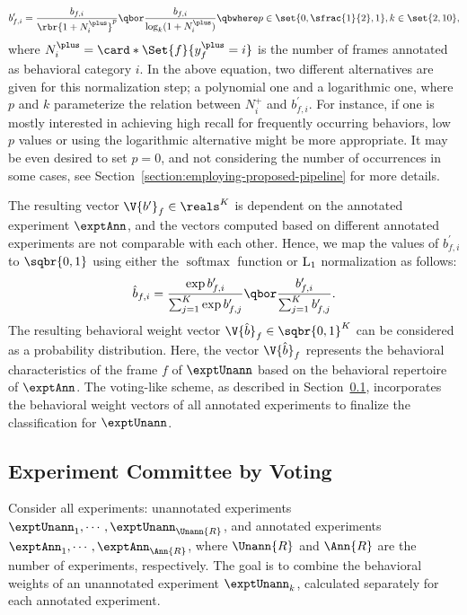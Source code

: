 \begin{equation}\label{equation:behavioral-weight-occurence-normalization}
	b^\prime_{f,i} = \frac{b_{f,i}}{\rbr{1 + N^{\plus}_i}^p} \qbor \frac{b_{f,i}}{\log_k(1 + N^{\plus}_i)} \qbwhere p \in \set{0, \sfrac{1}{2}, 1}, k \in \set{2, 10},
\end{equation}
where $N^{\plus}_i = \card*{\Set{f}{y^{\plus}_f=i}}$ is the number of frames annotated as behavioral category $i$.
In the above equation, two different alternatives are given for this normalization step; a polynomial one and a logarithmic one, where $p$ and $k$ parameterize the relation between $N^{\plus}_i$ and $b^\prime_{f,i}$.
For instance, if one is mostly interested in achieving high recall for frequently occurring behaviors, low $p$ values or using the logarithmic alternative might be more appropriate.
It may be even desired to set $p=0$, and not considering the number of occurrences in some cases, see Section~\ref{section:employing-proposed-pipeline} for more details.

The resulting vector $\V{b^{\prime}}_f \in \reals^K$ is dependent on the annotated experiment $\exptAnn$, and the vectors computed based on different annotated experiments are not comparable with each other.
Hence, we map the values of $b^\prime_{f,i}$ to $\sqbr{0,1}$ using either the $\operatorname {softmax}$ function or $\textnormal{L}_1$ normalization as follows:
\begin{equation}\label{equation:behavioral-weight-activation}
	\hat{b}_{f,i} = \frac{\exp{b^\prime_{f,i}}}{\sum_{j=1}^{K} \exp{b^\prime_{f,j}}} \qbor \frac{b^\prime_{f,i}}{\sum_{j=1}^{K} b^\prime_{f,j}}.
\end{equation}
The resulting behavioral weight vector $\V{\hat{b}}_f \in \sqbr{0,1}^K$ can be considered as a probability distribution.
Here, the vector $\V{\hat{b}}_f$ represents the behavioral characteristics of the frame $f$ of $\exptUnann$ based on the behavioral repertoire of $\exptAnn$.
The voting-like scheme, as described in Section~\ref{section:committee-by-voting}, incorporates the behavioral weight vectors of all annotated experiments to finalize the classification for $\exptUnann$.

\subsection{Experiment Committee by Voting}\label{section:committee-by-voting}
Consider all experiments: unannotated experiments $\exptUnann_1, \cdots, \exptUnann_{\Unann{R}}$, and annotated experiments $\exptAnn_1, \cdots, \exptAnn_{\Ann{R}}$, where $\Unann{R}$ and $\Ann{R}$ are the number of experiments, respectively.
The goal is to combine the behavioral weights of an unannotated experiment $\exptUnann_k$, calculated separately for each annotated experiment.

